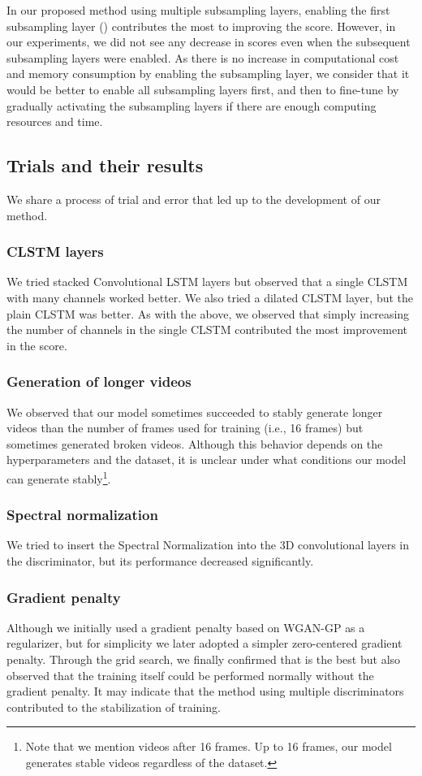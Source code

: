 \documentclass[twocolumn]{svjour3}
\begin{document}
In our proposed method using multiple subsampling layers,
enabling the first subsampling layer () contributes the most to improving the score.
However, in our experiments, we did not see any decrease in scores even when the subsequent subsampling layers were enabled.
As there is no increase in computational cost and memory consumption by enabling the subsampling layer,
we consider that it would be better to enable all subsampling layers first,
and then to fine-tune by gradually activating the subsampling layers
if there are enough computing resources and time.

\subsection{Trials and their results}
We share a process of trial and error that led up to the development of our method.

\subsubsection{CLSTM layers}
We tried stacked Convolutional LSTM layers but observed that a single CLSTM with many channels worked better.
We also tried a dilated CLSTM layer, but the plain CLSTM was better. As with the above, we observed that simply increasing the number of channels in the single CLSTM contributed the most improvement in the score.

\subsubsection{Generation of longer videos}
We observed that our model sometimes succeeded to stably generate longer videos than the number of frames used for training (i.e., 16 frames) but sometimes generated broken videos.
Although this behavior depends on the hyperparameters and the dataset, it is unclear under what conditions our model can generate stably\footnote{Note that we mention videos after 16 frames. Up to 16 frames, our model generates stable videos regardless of the dataset.}.

\subsubsection{Spectral normalization}
We tried to insert the Spectral Normalization \cite{Miyato2018} into the 3D convolutional layers in the discriminator, but its performance decreased significantly.

\subsubsection{Gradient penalty}
Although we initially used a gradient penalty based on WGAN-GP \cite{Gulrajani2017} as a regularizer, but for simplicity we later adopted a simpler zero-centered gradient penalty.
Through the grid search, we finally confirmed that  is the best but also observed that the training itself could be performed normally without the gradient penalty.
It may indicate that the method using multiple discriminators contributed to the stabilization of training.
\end{document}
